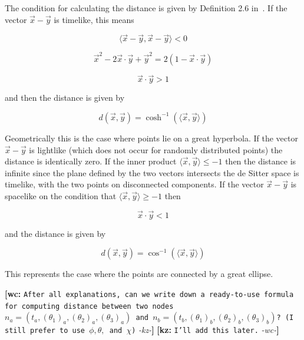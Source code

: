 \documentclass[preprint,notitlepage,amsmath,amssymb,floatfix]{revtex4-1}
\newcommand{\XXX}[3]{{\bf [#1: } {\tt #3} {\it -#2-}{\bf ]}}
\begin{document}
The condition for calculating the distance is given by Definition 2.6 in~\cite{ref:asmus2009}.
If the vector $\vec{x}-\vec{y}$ is timelike, this means

\begin{equation}
\langle\vec x - \vec y,\vec x - \vec y\rangle < 0
\end{equation}

\begin{equation}
\vec{x}^2 - 2\vec{x}\cdot\vec{y} + \vec{y}^2 = 2\left(1-\vec{x}\cdot\vec{y}\right)
\end{equation}

\begin{equation}
\vec{x}\cdot\vec{y} > 1
\end{equation}

\noindent and then the distance is given by

\begin{equation}
d(\vec{x},\vec{y}) = \cosh^{-1}(\langle \vec{x}, \vec{y}\rangle)
\end{equation}

\noindent Geometrically this is the case where points lie on a great hyperbola.  
If the vector $\vec{x}-\vec{y}$ is lightlike (which does not occur for randomly distributed points) the distance is identically zero.  
If the inner product $\langle \vec{x},\vec{y}\rangle \leq -1$ then the distance is infinite since the plane defined by the two vectors intersects the de Sitter space is timelike, with the two points on disconnected components.  
If the vector $\vec{x}-\vec{y}$ is spacelike on the condition that $\langle \vec{x},\vec{y}\rangle \geq -1$ then

\begin{equation}
\vec{x}\cdot\vec{y} < 1
\end{equation}

\noindent and the distance is given by

\begin{equation}
d(\vec{x},\vec{y}) = \cos^{-1}(\langle \vec{x},\vec{y}\rangle)
\end{equation}

\noindent This represents the case where the points are connected by a great ellipse.

\XXX{wc}{kz}{After all explanations, can we write down a ready-to-use formula for computing distance between two nodes $n_a=(t_a,(\theta_1)_a,(\theta_2)_a,(\theta_3)_a)$  and $n_b=(t_b,(\theta_1)_b,(\theta_2)_b,(\theta_3)_b)$? (I still prefer to use $\phi, \theta,$ and $\chi$)} \XXX{kz}{wc}{I'll add this later.}
\end{document}
